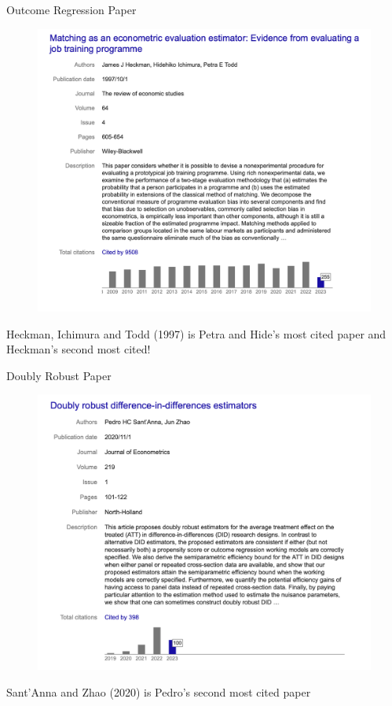 \documentclass{beamer}
\begin{document}
\begin{frame}{Outcome Regression Paper}

	\begin{figure}
	\includegraphics[scale=0.25]{./lecture_includes/or_cites}
	\end{figure}Heckman, Ichimura and Todd (1997) is Petra and Hide's most cited paper and Heckman's second most cited!

\end{frame}



\begin{frame}{Doubly Robust Paper}

	\begin{figure}
	\includegraphics[scale=0.25]{./lecture_includes/pedro_dr_cites}
	\end{figure}Sant'Anna and Zhao (2020) is Pedro's second most cited paper

\end{frame}
\end{document}

